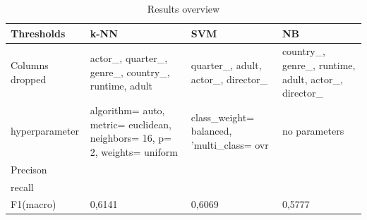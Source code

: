 
\begin{center}
\begin{table}
	\begin{tabular}{ | p{} | p{} | p{2.5cm} | p{3cm}|}
    \hline
   Thresholds & k-NN & SVM & NB\\ \hline
    Columns dropped & actor\_, quarter\_, genre\_, country\_, runtime, adult & quarter\_, adult, actor\_, director\_ & country\_, genre\_, runtime, adult, actor\_, director\_  \\ \hline
    hyperparameter & algorithm= auto, metric= euclidean, neighbors= 16, p= 2, weights= uniform & class\_weight= balanced, 'multi\_class= ovr & no parameters  \\ \hline
    Precison&  &  &  \\ \hline
	recall &  &  &   \\ \hline
	F1(macro) & 0,6141 & 0,6069 & 0,5777 \\ \hline
    
    \end{tabular}
    \caption{Results overview} 
   \label{tab:values}
\end{table}
\end{center}

